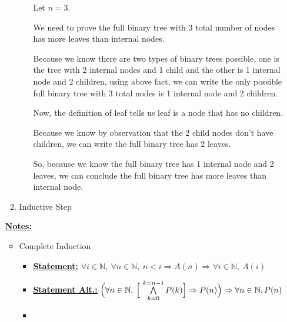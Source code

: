 \documentclass[12pt]{article}
\begin{document}
\begin{itemize}
\begin{mdframed}
\begin{enumerate}[1.]
\begin{enumerate}[1.]
\begin{mdframed}
                \bigskip

                Let $n = 3$.

                \bigskip

                We need to prove the full binary tree with 3 total number of nodes
                has more leaves than internal nodes.

                \bigskip

                Because we know there are two types of binary trees possible,
                one is the tree with 2 internal nodes and 1 child and the other
                is 1 internal node and 2 children, using above fact, we can write
                the only possible full binary tree with 3 total nodes is 1 internal
                node and 2 children.

                \bigskip

                Now, the definition of leaf tells us leaf is a node that has no children.

                \bigskip

                Because we know by observation that the 2 child nodes don't
                have children, we can write the full binary tree has 2 leaves.

                \bigskip

                So, because we know the full binary tree has 1 internal node
                and 2 leaves, we can conclude the full binary tree has more
                leaves than internal node.

                \end{mdframed}
            \end{enumerate}
            \item Inductive Step
        \end{enumerate}

    \end{mdframed}

    \bigskip

    \underline{\textbf{Notes:}}

    \bigskip

    \begin{itemize}
        \item Complete Induction
        \begin{itemize}
            \item \underline{\textbf{Statement:}} $\forall i \in \mathbb{N},\:\forall n \in \mathbb{N},\:n < i \Rightarrow A(n) \Rightarrow \forall i \in \mathbb{N},\:A(i)$
            \item \underline{\textbf{Statement Alt.:}} $\Bigl(\forall n \in \mathbb{N},\:\Bigl[ \ \bigwedge\limits_{k = 0}^{k=n-1} P(k) \Bigr] \Rightarrow P(n) \Bigr) \Rightarrow \forall n \in \mathbb{N}, P(n)$
            \item


\end{itemize}
\end{itemize}
\end{itemize}
\end{document}
